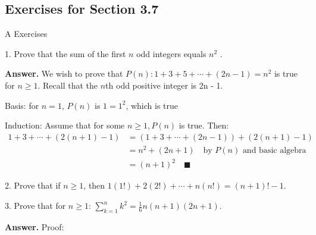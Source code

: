 \documentclass[10pt,]{book}
\theoremstyle{plain}
\theoremstyle{definition}
\theoremstyle{definition}
\theoremstyle{definition}
\theoremstyle{definition}
\begin{document}
\subsection[Exercises for Section 3.7]{Exercises for Section 3.7}\label{exercises-3.7}
\hypertarget{exercisegroup-9}{}\typeout{************************************************}
\typeout{************************************************}
A Exercises%
\begin{exercisegroup}
\item[1.]\hypertarget{exercise-38}{}Prove that the sum of the first \(n\) odd integers equals \(n^2\) .
%
\par\smallskip
\par\smallskip
\noindent\textbf{Answer.}\hypertarget{answer-18}{}\quad
 We wish to prove that \(P(n):1+3+5+\cdots +(2n-1)=n^2\) is true for \(n \geqslant 1\). Recall that the \(n\)th odd positive integer is 2n - 1.%
\par
Basis:  for \(n=1\), \(P(n)\) is \(1=1^2\), which is true%
\par
Induction:  Assume that for some \(n\geqslant 1, P(n)\) is true. Then:
\begin{equation*}
\begin{split}
1+3+\cdots +(2(n+1)-1) &= (1+3+\cdots +(2n-1) ) +(2(n+1)-1)\\
	& =n^2+(2n+1) \quad \textrm{by } P(n) \textrm{ and basic algebra}\\
	& =(n+1)^2 \quad \blacksquare
\end{split}
\end{equation*}
%
\item[2.]\hypertarget{exercise-39}{}Prove that if \(n \geq  1\), then \(1(1!) + 2(2!) + \cdots  + n(n!) = (n + 1)! - 1\).
%
\par\smallskip
\item[3.]\hypertarget{exercise-40}{}Prove that for \(n \geq  1\): \(\sum_{k=1}^n k^2= \frac{1}{6} n(n+1) (2 n+1)\).%
\par\smallskip
\par\smallskip
\noindent\textbf{Answer.}\hypertarget{answer-19}{}\quad
 Proof: %
\par
\leavevmode%
\end{exercisegroup}
\end{document}
